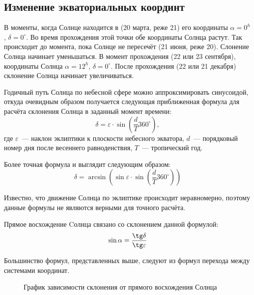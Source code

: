 \subsection{Изменение экваториальных координт}
В моменты, когда Солнце находится в  (20 марта, реже 21) его координаты $\alpha=0^h$, $\delta=0^{\circ}$. Во время прохождения этой точки обе координаты Солнца растут. Так происходит до момента, пока Солнце не пересечёт  (21 июня, реже 20). Слонение Солнца начинает уменьшаться. В момент прохождения  (22 или 23 сентября), координаты Солнца $\alpha=12^h$, $\delta=0^{\circ}$. После прохождения  (22 или 21 декабря) склонение Солнца начинает увеличиваться.

Годичный путь Солнца по небесной сфере можно аппроксимировать синусоидой, откуда очевидным образом получается следующая приближенная формула для расчёта склонения Солнца в заданный момент времени:
\begin{equation}
\delta=\varepsilon\cdot\sin \left(\frac{d}{T}360^{\circ}\right),
\end{equation}
где $\varepsilon$~--- наклон эклиптики к плоскости небесного экватора, $d$~--- порядковый номер дня после весеннего равноденствия, $T$~--- тропический год.

Более точная формула и выглядит следующим образом:
\begin{equation}
\delta=\arcsin\left(\sin\varepsilon\cdot\sin \left(\frac{d}{T}360^{\circ}\right)\right)
\end{equation}

Известно, что движение Солнца по эклиптике происходит неравномерно, поэтому данные формулы не являются верными для точного расчёта.

Прямое восхождение Cолнца связано со склонением данной формулой:
\begin{equation}
\sin\alpha=\frac{\tg\delta}{\tg\varepsilon}
\end{equation}

Большинство формул, представленных выше, следуют из формул перехода между системами координат. 


\begin{figure}[!h]
\centering
 \caption{График зависимости склонения от прямого восхождения Солнца}
\end{figure}